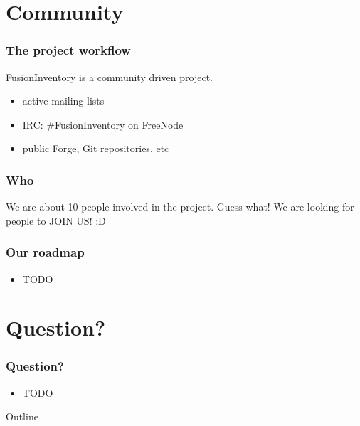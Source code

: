 \documentclass{beamer}
\begin{document}
\section{Community}
\begin{frame}
\frametitle{The project workflow}
FusionInventory is a community driven project.

\begin{itemize}

\item active mailing lists
\item IRC: \#FusionInventory on FreeNode
\item public Forge, Git repositories, etc

\end{itemize}
\end{frame}
\begin{frame}
\frametitle{Who}

We are about 10 people involved in the project.
\pause
Guess what!
\pause
We are looking for people to JOIN US! :D

\end{frame}
\begin{frame}

\frametitle{Our roadmap}
%
\begin{itemize}
%
\item TODO
%
\end{itemize}
\end{frame}

\section{Question?}
%
\begin{frame}
\frametitle{Question?}
%
\begin{itemize}
%
\item TODO
%
\end{itemize}
\end{frame}

\begin{frame}[shrink=20]{Outline}

\tableofcontents
\end{frame}
\end{document}
